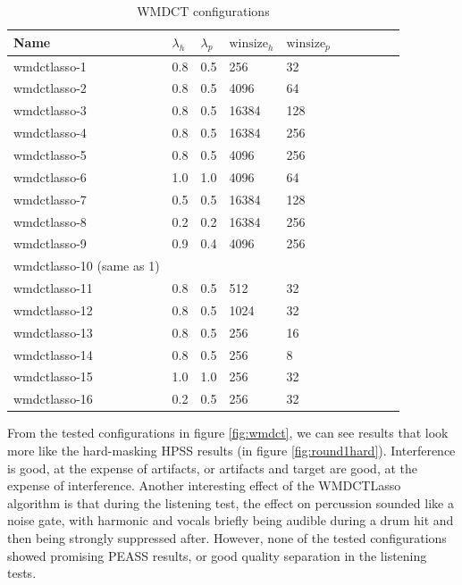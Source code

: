\documentclass[letter,12pt]{article}
\begin{document}
\begin{table}[ht]
	\centering
\begin{tabular}{ |l|l|l|l|l|c|c|c|c|c| }
	 \hline
	  Name & $\lambda_{h}$ & $\lambda_{p}$ & $\text{winsize}_{h}$ & $\text{winsize}_{p}$ \\
	 \hline
	 \hline
	 wmdctlasso-1 & 0.8 & 0.5 & 256 & 32 \\
	 \hline
	 wmdctlasso-2 & 0.8 & 0.5 & 4096 & 64 \\
	 \hline
	 wmdctlasso-3 & 0.8 & 0.5 & 16384 & 128 \\
	 \hline
	 wmdctlasso-4 & 0.8 & 0.5 & 16384 & 256 \\
	 \hline
	 wmdctlasso-5 & 0.8 & 0.5 & 4096 & 256 \\
	 \hline
	 wmdctlasso-6 & 1.0 & 1.0 & 4096 & 64 \\
	 \hline
	 wmdctlasso-7 & 0.5 & 0.5 & 16384 & 128 \\
	 \hline
	 wmdctlasso-8 & 0.2 & 0.2 & 16384 & 256 \\
	 \hline
	 wmdctlasso-9 & 0.9 & 0.4 & 4096 & 256 \\
	 \hline
	 wmdctlasso-10 (same as 1) & & & & \\
	 \hline
	 wmdctlasso-11 & 0.8 & 0.5 & 512 & 32 \\
	 \hline
	 wmdctlasso-12 & 0.8 & 0.5 & 1024 & 32 \\
	 \hline
	 wmdctlasso-13 & 0.8 & 0.5 & 256 & 16 \\
	 \hline
	 wmdctlasso-14 & 0.8 & 0.5 & 256 & 8 \\
	 \hline
	 wmdctlasso-15 & 1.0 & 1.0 & 256 & 32 \\
	 \hline
	 wmdctlasso-16 & 0.2 & 0.5 & 256 & 32 \\
	 \hline
\end{tabular}
	\caption{WMDCT configurations}
	\label{table:round2wmdct}
\end{table}

From the tested configurations in figure \ref{fig:wmdct}, we can see results that look more like the hard-masking HPSS results (in figure \ref{fig:round1hard}). Interference is good, at the expense of artifacts, or artifacts and target are good, at the expense of interference. Another interesting effect of the WMDCTLasso algorithm is that during the listening test, the effect on percussion sounded like a noise gate, with harmonic and vocals briefly being audible during a drum hit and then being strongly suppressed after. However, none of the tested configurations showed promising PEASS results, or good quality separation in the listening tests.
\end{document}
